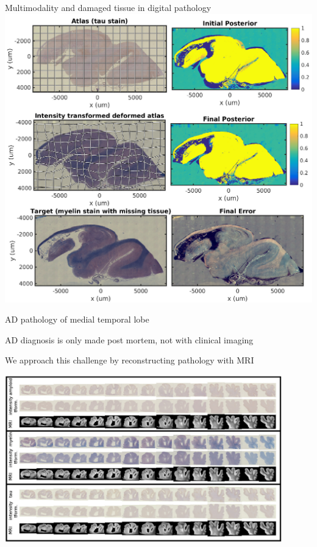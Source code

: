 \documentclass{beamer}
\begin{document}
\begin{frame}{Multimodality and damaged tissue in digital pathology}
\phantom{.}\hfill
\includegraphics[height=0.9\textheight]{missing_data_different_intensity_digital_pathology.png}
\hfill\phantom{.}
\end{frame}

\begin{frame}{AD pathology of medial temporal lobe}

AD diagnosis is only made post mortem, not with clinical imaging

\vspace{0.5em}

We approach this challenge by reconstructing pathology with  MRI


\phantom{.}\hfill
\includegraphics[width=0.9\textwidth]{all_slices.png}
\hfill\phantom{.}

\end{frame}
\end{document}
